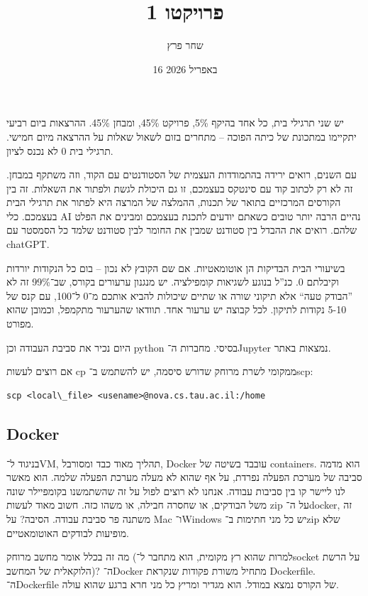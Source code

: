 \documentclass[]{../../../tex/classes/styledArticle}
\author{שחר פרץ}
\title{פרויקטו 1}
\date{16 באפריל 2026}
\begin{document}
	\maketitle
	יש שני תרגילי בית, כל אחד בהיקף 5\%, פרויקט 45\%, ומבחן 45\%. ההרצאות ביום רביעי יתקיימו במתכונת של כיתה הפוכה – מתחרים בזום לשאול שאלות על ההרצאה מיום חמישי. תרגילי בית 0 לא נכנס לציון. 
	
	עם השנים, רואים ירידה בהתמודדות העצמית של הסטודנטים עם הקוד, וזה משתקף במבחן. זה לא רק לכתוב קוד עם סינטקס בעצמכם, זו גם היכולת לגשת ולפתור את השאלות. זה בין הקורסים המרכזיים בתואר של תכנות, ההמלצה של המרצה היא לפתור את תרגילי הבית בעצמכם. כלי AI נהיים הרבה יותר טובים כשאתם יודעים לתכנת בעצמכם ומבינים את הפלט שלהם. רואים את ההבדל בין סטודנט שמבין את החומר לבין סטודנט שלמד כל הסמסטר עם chatGPT. 
	
	בשיעורי הבית הבדיקות הן אוטומאטיות. אם שם הקובץ לא נכון – בום כל הנקודות יורדות וקיבלתם 0. כנ''ל בנוגע לשגיאות קומפילציה. יש מנגנון ערעורים בקורס, שב־99\% זה לא ''הבודק טעה`` אלא תיקוני שורה או שתיים שיכולות להביא אותכם מ־0 ל־100, עם קנס של 5-10 נקודות לתיקון. לכל קבוצה יש ערעור אחד. תוודאו שהערעור מתקמפל, וכמובן שהוא מפורט. 
	
	היום נכיר את סביבת העבודה וכן python בסיסי. מחברות ה־Jupyter נמצאות באתר. 
	
	אם רוצים לעשות cp ממקומי לשרת מרוחק שדורש סיסמה, יש להשתמש ב־scp: 
	
	
	\sen\begin{lstlisting}
scp <local\_file> <usename>@nova.cs.tau.ac.il:/home
	\end{lstlisting}\she
	
	\sen
	\subsection*{Docker}
	\she
	
	בניגוד ל־VM, תהליך מאוד כבד  ומסורבל, Docker עובבד בשיטה של containers. הוא מדמה סביבה של מערכת הפעלה נפרדת, על אף שהוא לא מעלה מערכת הפעלה שלמה. הוא מאשר לנו ליישר קו בין סביבות עבודה. אנחנו לא רוצים לפול על זה שהשתמשנו בקומפיילר שונה משל הבודקים, או שחסרה חבילה, או משהו כזה. חשוב מאוד לעשות zip על ה־docker, זה משתנה פר סביבת עבודה. הסיבה? על Mac ו־Windows יש כל מני חתימות ב־zip שלא מופיעות לבודקים האוטומאטיים. 
	
	מה זה בכלל אומר מחשב מרוחק (למרות שהוא רץ מקומית, הוא מתחבר ל־socket על הרשת הלוקאלית של המחשב)? ה־Docker מתחיל משורת פקודות שנקראת Dockerfile. ה־Dockerfile של הקורס נמצא במודל. הוא מגדיר ומריץ כל מני חרא ברגע שהוא עולה. 
	
\end{document}
